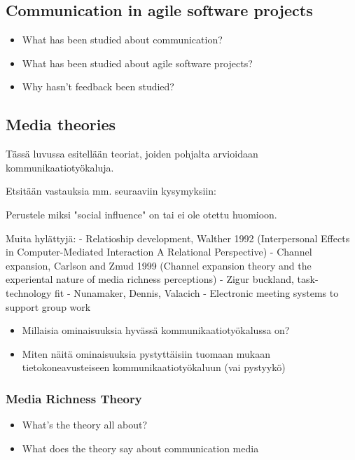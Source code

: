\documentclass[english,12pt,a4paper,pdftex]{article}
\begin{document}
\subsection{Communication in agile software projects}

\begin{itemize}
\item What has been studied about communication?
\item What has been studied about agile software projects?
\item Why hasn't feedback been studied?
\end{itemize}

\subsection{Media theories}

Tässä luvussa esitellään teoriat, joiden pohjalta arvioidaan kommunikaatiotyökaluja.

Etsitään vastauksia mm. seuraaviin kysymyksiin:

Perustele miksi "social influence" on tai ei ole otettu huomioon.

Muita hylättyjä: 
- Relatioship development, Walther 1992 (Interpersonal Effects in Computer-Mediated Interaction A Relational Perspective)
- Channel expansion, Carlson and Zmud 1999 (Channel expansion theory and the experiental nature of media richness perceptions)
- Zigur buckland, task-technology fit
- Nunamaker, Dennis, Valacich - Electronic meeting systems to support group work

\begin{itemize}
\item Millaisia ominaisuuksia hyvässä kommunikaatiotyökalussa on?
\item Miten näitä ominaisuuksia pystyttäisiin tuomaan mukaan tietokoneavusteiseen kommunikaatiotyökaluun (vai pystyykö)
\end{itemize}

\subsubsection{Media Richness Theory}

\begin{itemize}
\item What's the theory all about?
\item What does the theory say about communication media
\end{itemize}
\end{document}
